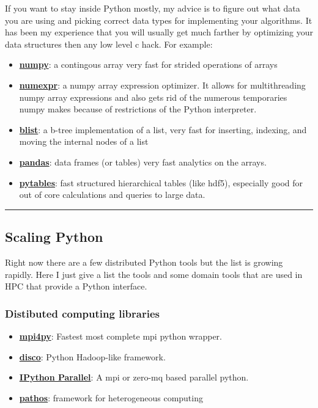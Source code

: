 \documentclass{article}
\begin{document}
If you want to stay inside Python mostly, my advice is to figure out
what data you are using and picking correct data types for implementing
your algorithms. It has been my experience that you will usually get
much farther by optimizing your data structures then any low level c
hack. For example:

\begin{itemize}
\item
  \textbf{\href{http://numpy.scipy.org/}{numpy}}: a contingous array
  very fast for strided operations of arrays
\item
  \textbf{\href{http://code.google.com/p/numexpr/}{numexpr}}: a numpy
  array expression optimizer. It allows for multithreading numpy array
  expressions and also gets rid of the numerous temporaries numpy makes
  because of restrictions of the Python interpreter.
\item
  \textbf{\href{http://pypi.python.org/pypi/blist}{blist}}: a b-tree
  implementation of a list, very fast for inserting, indexing, and
  moving the internal nodes of a list
\item
  \textbf{\href{http://pandas.pydata.org/}{pandas}}: data frames (or
  tables) very fast analytics on the arrays.
\item
  \textbf{\href{http://www.pytables.org/moin}{pytables}}: fast
  structured hierarchical tables (like hdf5), especially good for out of
  core calculations and queries to large data.
\end{itemize}

    \begin{center}\rule{3in}{0.4pt}\end{center}

\subsection{Scaling Python}\label{scaling-python}

Right now there are a few distributed Python tools but the list is
growing rapidly. Here I just give a list the tools and some domain tools
that are used in HPC that provide a Python interface.

\subsubsection{Distibuted computing
libraries}\label{distibuted-computing-libraries}

\begin{itemize}
\itemsep1pt\parskip0pt
\item
  \textbf{\href{http://mpi4py.scipy.org/}{mpi4py}}: Fastest most
  complete mpi python wrapper.
\item
  \textbf{\href{http://discoproject.org/}{disco}}: Python Hadoop-like
  framework.
\item
  \textbf{\href{http://ipython.org/ipython-doc/dev/parallel/index.html}{IPython
  Parallel}}: A mpi or zero-mq based parallel python.
\item
  \textbf{\href{http://dev.danse.us/trac/pathos}{pathos}}: framework for
  heterogeneous computing
\end{itemize}
\end{document}
